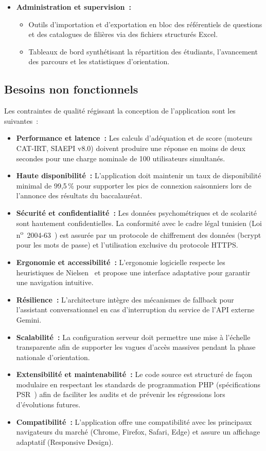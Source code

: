 \begin{itemize}
    \item \textbf{Administration et supervision~:}
    \begin{itemize}
        \item Outils d'importation et d'exportation en bloc des référentiels de questions et des catalogues de filières via des fichiers structurés Excel.
        \item Tableaux de bord synthétisant la répartition des étudiants, l'avancement des parcours et les statistiques d'orientation.
    \end{itemize}
\end{itemize}

\subsection{Besoins non fonctionnels}

Les contraintes de qualité régissant la conception de l'application sont les suivantes~:

\begin{itemize}
    \item \textbf{Performance et latence~:} Les calculs d'adéquation et de score (moteurs CAT-IRT, SIAEPI v8.0) doivent produire une réponse en moins de deux secondes pour une charge nominale de 100 utilisateurs simultanés.
    \item \textbf{Haute disponibilité~:} L'application doit maintenir un taux de disponibilité minimal de 99,5\,\% pour supporter les pics de connexion saisonniers lors de l'annonce des résultats du baccalauréat.
    \item \textbf{Sécurité et confidentialité~:} Les données psychométriques et de scolarité sont hautement confidentielles. La conformité avec le cadre légal tunisien (Loi n\textsuperscript{o}~2004-63~\cite{loi2004}) est assurée par un protocole de chiffrement des données (bcrypt pour les mots de passe) et l'utilisation exclusive du protocole HTTPS.
    \item \textbf{Ergonomie et accessibilité~:} L'ergonomie logicielle respecte les heuristiques de Nielsen~\cite{nielsen} et propose une interface adaptative pour garantir une navigation intuitive.
    \item \textbf{Résilience~:} L'architecture intègre des mécanismes de fallback pour l'assistant conversationnel en cas d'interruption du service de l'API externe Gemini.
    \item \textbf{Scalabilité~:} La configuration serveur doit permettre une mise à l'échelle transparente afin de supporter les vagues d'accès massives pendant la phase nationale d'orientation.
    \item \textbf{Extensibilité et maintenabilité~:} Le code source est structuré de façon modulaire en respectant les standards de programmation PHP (spécifications PSR~\cite{psr}) afin de faciliter les audits et de prévenir les régressions lors d'évolutions futures.
    \item \textbf{Compatibilité~:} L'application offre une compatibilité avec les principaux navigateurs du marché (Chrome, Firefox, Safari, Edge) et assure un affichage adaptatif (Responsive Design).
\end{itemize}

